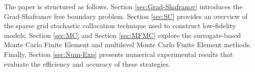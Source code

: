  




The paper is structured as follows. Section \ref{sec:Grad-Shafranov} introduces the Grad-Shafranov free boundary problem.  Section \ref{sec:SC} provides an overview of the sparse grid stochastic collocation technique used to construct low-fidelity models. Section \ref{sec:MC} and Section \ref{sec:MFMC} explore the surrogate-based Monte Carlo Finite Element and multilevel Monte Carlo Finite Element methods. Finally, Section \ref{sec:Num-Exp} presents numerical experimental results that evaluate the efficiency and accuracy of these strategies.

